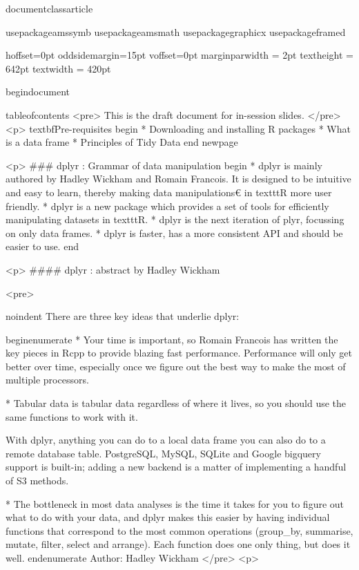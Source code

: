documentclass{article}

usepackage{amssymb}
usepackage{amsmath}
usepackage{graphicx}
usepackage{framed}

hoffset=0pt
oddsidemargin=15pt
voffset=0pt
marginparwidth = 2pt
textheight = 642pt
textwidth = 420pt

begin{document}

tableofcontents
<pre>
This is the draft document for in-session slides.
</pre>
<p>
textbf{Pre-requisites}
begin{ }
         * Downloading and installing R packages
         * What is a data frame
         * Principles of Tidy Data
end{ }
newpage




<p>
### {dplyr : Grammar of data manipulation}
begin{ }
         * dplyr  is mainly authored by Hadley Wickham and Romain Francois. It is designed to be intuitive and easy to learn, thereby making data manipulations€ in texttt{R} more user friendly.
         * dplyr is a new package which provides a set of tools for efficiently manipulating datasets in texttt{R}.
         * dplyr is the next iteration of plyr, focussing on only data frames.          * dplyr is faster, has a more consistent API and should be easier to use. 
end{ }


<p>
#### {dplyr : abstract by Hadley Wickham}

<pre>


noindent There are three key ideas that underlie dplyr:

begin{enumerate}
         * Your time is important, so Romain Francois has written the key pieces in Rcpp to provide blazing fast performance. Performance will only get better over time, especially once we figure out the best way to make the most of multiple processors. 

         * Tabular data is tabular data regardless of where it lives, so you should use the same functions to work with it. 

With dplyr, anything you can do to a local data frame you can also do to a remote database table. PostgreSQL, MySQL, SQLite and Google bigquery support is built-in; adding a new backend is a matter of implementing a handful of S3 methods. 

         * The bottleneck in most data analyses is the time it takes for you to figure out what to do with your data, and dplyr makes this easier by having individual functions that correspond to the most common operations  (group_by, summarise, mutate, filter, select and arrange). Each function does one only thing, but does it well.
end{enumerate}
Author: Hadley Wickham
</pre>
<p>


